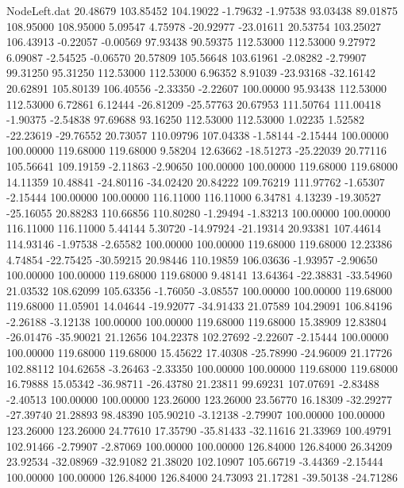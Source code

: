 \begin{filecontents}{NodeLeft.dat}
  20.48679  103.85452  104.19022    -1.79632   -1.97538   93.03438   89.01875  108.95000  108.95000    5.09547    4.75978  -20.92977  -23.01611
  20.53754  103.25027  106.43913    -0.22057   -0.00569   97.93438   90.59375  112.53000  112.53000    9.27972    6.09087   -2.54525   -0.06570
  20.57809  105.56648  103.61961    -2.08282   -2.79907   99.31250   95.31250  112.53000  112.53000    6.96352    8.91039  -23.93168  -32.16142
  20.62891  105.80139  106.40556    -2.33350   -2.22607  100.00000   95.93438  112.53000  112.53000    6.72861    6.12444  -26.81209  -25.57763
  20.67953  111.50764  111.00418    -1.90375   -2.54838   97.69688   93.16250  112.53000  112.53000    1.02235    1.52582  -22.23619  -29.76552
  20.73057  110.09796  107.04338    -1.58144   -2.15444  100.00000  100.00000  119.68000  119.68000    9.58204   12.63662  -18.51273  -25.22039
  20.77116  105.56641  109.19159    -2.11863   -2.90650  100.00000  100.00000  119.68000  119.68000   14.11359   10.48841  -24.80116  -34.02420
  20.84222  109.76219  111.97762    -1.65307   -2.15444  100.00000  100.00000  116.11000  116.11000    6.34781    4.13239  -19.30527  -25.16055
  20.88283  110.66856  110.80280    -1.29494   -1.83213  100.00000  100.00000  116.11000  116.11000    5.44144    5.30720  -14.97924  -21.19314
  20.93381  107.44614  114.93146    -1.97538   -2.65582  100.00000  100.00000  119.68000  119.68000   12.23386    4.74854  -22.75425  -30.59215
  20.98446  110.19859  106.03636    -1.93957   -2.90650  100.00000  100.00000  119.68000  119.68000    9.48141   13.64364  -22.38831  -33.54960
  21.03532  108.62099  105.63356    -1.76050   -3.08557  100.00000  100.00000  119.68000  119.68000   11.05901   14.04644  -19.92077  -34.91433
  21.07589  104.29091  106.84196    -2.26188   -3.12138  100.00000  100.00000  119.68000  119.68000   15.38909   12.83804  -26.01476  -35.90021
  21.12656  104.22378  102.27692    -2.22607   -2.15444  100.00000  100.00000  119.68000  119.68000   15.45622   17.40308  -25.78990  -24.96009
  21.17726  102.88112  104.62658    -3.26463   -2.33350  100.00000  100.00000  119.68000  119.68000   16.79888   15.05342  -36.98711  -26.43780
  21.23811   99.69231  107.07691    -2.83488   -2.40513  100.00000  100.00000  123.26000  123.26000   23.56770   16.18309  -32.29277  -27.39740
  21.28893   98.48390  105.90210    -3.12138   -2.79907  100.00000  100.00000  123.26000  123.26000   24.77610   17.35790  -35.81433  -32.11616
  21.33969  100.49791  102.91466    -2.79907   -2.87069  100.00000  100.00000  126.84000  126.84000   26.34209   23.92534  -32.08969  -32.91082
  21.38020  102.10907  105.66719    -3.44369   -2.15444  100.00000  100.00000  126.84000  126.84000   24.73093   21.17281  -39.50138  -24.71286

\end{filecontents}
